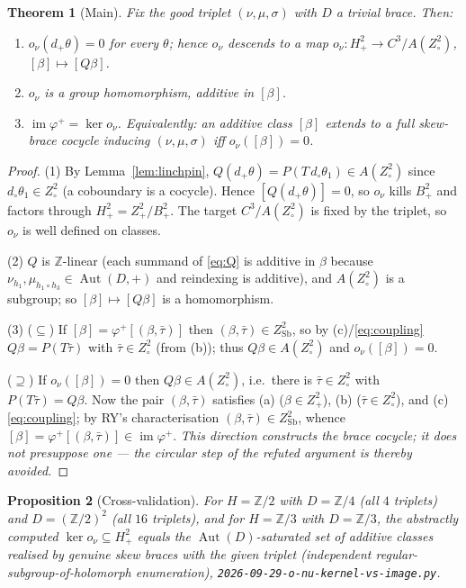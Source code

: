 \documentclass[11pt]{article}
\newtheorem{theorem}{Theorem}
\newtheorem{proposition}[theorem]{Proposition}
\theoremstyle{definition}
\newcommand{\Sb}{\mathrm{Sb}}
\newcommand{\Z}{\mathbb{Z}}
\newcommand{\im}{\operatorname{im}}
\newcommand{\Aut}{\operatorname{Aut}}
\begin{document}
\begin{theorem}[Main]\label{thm:main}
Fix the good triplet $(\nu,\mu,\sigma)$ with $D$ a trivial brace. Then:
\begin{enumerate}\itemsep2pt
\item[\rm(1)] $o_\nu(d_+\theta)=0$ for every $\theta$; hence $o_\nu$ descends to a map
$o_\nu:H^2_+\to C^3/A(Z^2_\circ)$, $[\beta]\mapsto[Q\beta]$.
\item[\rm(2)] $o_\nu$ is a group homomorphism, additive in $[\beta]$.
\item[\rm(3)] $\im\varphi^+=\ker o_\nu$. Equivalently: an additive class $[\beta]$ extends to
a full skew-brace cocycle inducing $(\nu,\mu,\sigma)$ \emph{iff} $o_\nu([\beta])=0$.
\end{enumerate}
\end{theorem}
\begin{proof}
(1) By Lemma~\ref{lem:linchpin}, $Q(d_+\theta)=P(T\,d_\circ\theta_1)\in A(Z^2_\circ)$ since
$d_\circ\theta_1\in Z^2_\circ$ (a coboundary is a cocycle). Hence $[Q(d_+\theta)]=0$, so
$o_\nu$ kills $B^2_+$ and factors through $H^2_+=Z^2_+/B^2_+$. The target $C^3/A(Z^2_\circ)$
is fixed by the triplet, so $o_\nu$ is well defined on classes.

(2) $Q$ is $\Z$-linear (each summand of \eqref{eq:Q} is additive in $\beta$ because
$\nu_{h_1},\mu_{h_1\circ h_3}\in\Aut(D,+)$ and reindexing is additive), and
$A(Z^2_\circ)$ is a subgroup; so $[\beta]\mapsto[Q\beta]$ is a homomorphism.

(3) ($\subseteq$) If $[\beta]=\varphi^+[(\beta,\bar\tau)]$ then $(\beta,\bar\tau)\in Z^2_\Sb$,
so by (c)/\eqref{eq:coupling} $Q\beta=P(T\bar\tau)$ with $\bar\tau\in Z^2_\circ$ (from (b));
thus $Q\beta\in A(Z^2_\circ)$ and $o_\nu([\beta])=0$.

($\supseteq$) If $o_\nu([\beta])=0$ then $Q\beta\in A(Z^2_\circ)$, i.e.\ there is
$\bar\tau\in Z^2_\circ$ with $P(T\bar\tau)=Q\beta$. Now the pair $(\beta,\bar\tau)$ satisfies
(a) ($\beta\in Z^2_+$), (b) ($\bar\tau\in Z^2_\circ$), and (c) \eqref{eq:coupling}; by RY's
characterisation $(\beta,\bar\tau)\in Z^2_\Sb$, whence $[\beta]=\varphi^+[(\beta,\bar\tau)]
\in\im\varphi^+$. \emph{This direction constructs the brace cocycle; it does not presuppose
one --- the circular step of the refuted argument is thereby avoided.}
\end{proof}

\begin{proposition}[Cross-validation]\label{prop:cross}
For $H=\Z/2$ with $D=\Z/4$ (all $4$ triplets) and $D=(\Z/2)^2$ (all $16$ triplets), and for
$H=\Z/3$ with $D=\Z/3$, the abstractly computed $\ker o_\nu\subseteq H^2_+$ equals the
$\Aut(D)$-saturated set of additive classes realised by genuine skew braces with the given
triplet (independent regular-subgroup-of-holomorph enumeration),
\texttt{2026-09-29-o-nu-kernel-vs-image.py}.
\end{proposition}
\end{document}
